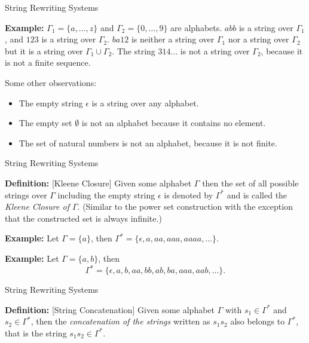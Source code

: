 \documentclass{beamer}
\begin{document}
\begin{frame}[fragile]{String Rewriting Systems}

\small

{\bf Example:}    $\Gamma_1 = \{a, \ldots, z\}$ and $\Gamma_2 = \{0,\dots, 9\}$ are alphabets. $abb$ is a string over $\Gamma_1$, and $123$ is a string over $\Gamma_2$. $ba12$ is neither a string over $\Gamma_1$ nor a string over $\Gamma_2$ but it is a string over $\Gamma_1\cup\Gamma_2$. 
The string $314 \ldots$ is not a string over $\Gamma_2$, because it is not a finite sequence.

\vspace{.1in}

Some other observations:
\begin{itemize}
\item The empty string  $\epsilon$ is a string over any alphabet.
\item The empty set $\emptyset$ is not an alphabet because it contains no element. 
\item The set of natural numbers is not an alphabet, because it is not finite. 
\end{itemize}
\end{frame}

\begin{frame}[fragile]{String Rewriting Systems}

{\bf Definition:} [Kleene Closure] Given some alphabet $\Gamma$ then the set of all possible strings over
$\Gamma$ including the empty string $\epsilon$ is denoted by $\Gamma^*$ and is called the {\em Kleene 
Closure of $\Gamma$}.  (Similar to the power set construction with the exception that the constructed set is always infinite.)

\vspace{.1in}
{\bf Example:} Let $\Gamma = \{ a \}$, then $\Gamma^* = \{\epsilon, a, aa, aaa, aaaa,\dots\}$.

\vspace{.1in}
{\bf Example:} Let $\Gamma = \{a,b\}$, then 
\[
\Gamma^* = \{\epsilon,a,b,aa,bb,ab,ba,aaa,aab,\ldots\}.
\]
\end{frame}

\begin{frame}[fragile]{String Rewriting Systems}

{\bf Definition:} [String Concatenation] Given some alphabet $\Gamma$ with $s_1\in\Gamma^*$ and $s_2\in\Gamma^*$, 
then the {\em concatenation of the strings} written as $s_1s_2$ also belongs to $\Gamma^*$, that is
the string $s_1s_2\in\Gamma^*$.
\end{frame}
\end{document}
